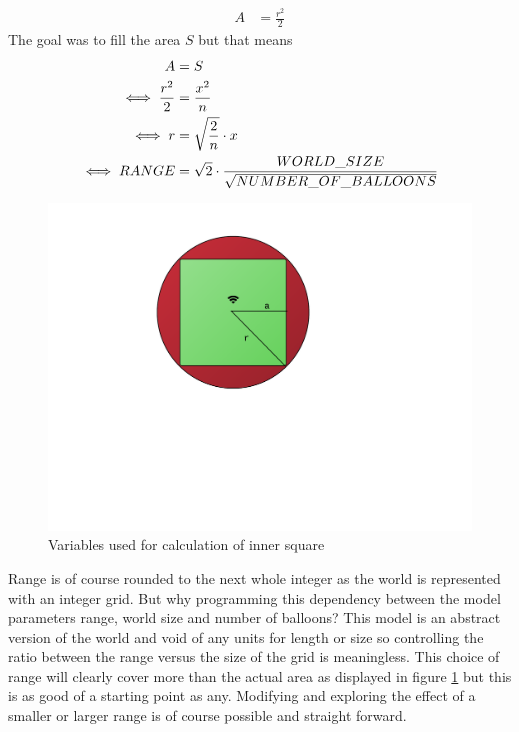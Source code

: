 \begin{align}
A &= \frac{r^2}{2}
\end{align}
The goal was to fill the area $S$ but that means
\begin{align}
A &= S\notag \\
\iff \frac{r^2}{2} &= \frac{x^2}{n}\notag \\
\iff r &= \sqrt{\frac{2}{n}}\cdot x \notag \\
\iff RANGE &= \sqrt{2} \cdot \frac{WORLD\_SIZE}{\sqrt{NUMBER\_OF\_BALLOONS}} \notag
\end{align}
\begin{figure}[H]
    \centering
    \includegraphics[scale = 0.5,trim=3cm 8cm 6cm 2cm, clip]{graphics/innersquare.pdf}
    \caption{Variables used for calculation of inner square}
    \label{fig:innersquare}
\end{figure}

Range is of course rounded to the next whole integer as the world is represented with an integer grid. But why programming this dependency between the model parameters range, world size and number of balloons? This model is an abstract version of the world and void of any units for length or size so controlling the ratio between the range versus the size of the grid is meaningless. This choice of range will clearly cover more than the actual area as displayed in figure \ref{fig:innersquare} but this is as good of a starting point as any. Modifying and exploring the effect of a smaller or larger range is of course possible and straight forward.